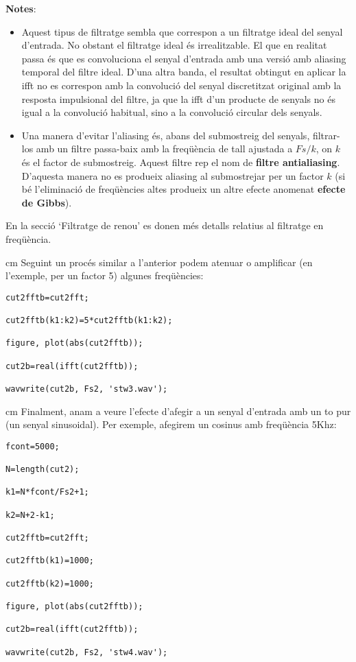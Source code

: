 \documentclass{article}
\begin{document}
\textbf{Notes}:
\begin{itemize}
\item Aquest tipus de filtratge sembla que correspon a un filtratge ideal  del senyal d'entrada. No obstant
el filtratge ideal és irrealitzable. El que en realitat passa és que es convoluciona el senyal d'entrada amb una versió amb
aliasing temporal del filtre ideal. D'una altra banda, el resultat obtingut en aplicar la ifft no es correspon amb la convolució
del senyal discretitzat original amb la resposta impulsional del filtre, ja que la ifft d'un producte de senyals no és igual
a la convolució habitual, sino a la convolució circular dels senyals.
\item Una manera d'evitar l'aliasing és, abans del submostreig del senyals, filtrar-los amb un filtre passa-baix amb la
freqüència de tall ajustada a $Fs/k$, on $k$ és el factor de submostreig. Aquest filtre rep el nom de \textbf{filtre antialiasing}.
D'aquesta manera no es produeix aliasing al submostrejar per un factor $k$
(si bé l'eliminació de freqüències altes produeix un altre efecte anomenat \textbf{efecte de Gibbs}).
\end{itemize}

En la secció `Filtratge de renou' es donen més detalls relatius al filtratge en freqüència.


 cm
Seguint un procés similar a l'anterior podem atenuar o amplificar (en l'exemple, per un factor 5) algunes freqüències:
\begin{verbatim}
cut2fftb=cut2fft;

cut2fftb(k1:k2)=5*cut2fftb(k1:k2);

figure, plot(abs(cut2fftb));

cut2b=real(ifft(cut2fftb));

wavwrite(cut2b, Fs2, 'stw3.wav');
\end{verbatim}

 cm
Finalment, anam a veure l'efecte d'afegir a un senyal d'entrada amb un to pur (un senyal sinusoidal).
Per exemple, afegirem un cosinus amb freqüència 5Khz:

\begin{verbatim}
fcont=5000;

N=length(cut2);

k1=N*fcont/Fs2+1;

k2=N+2-k1;

cut2fftb=cut2fft;

cut2fftb(k1)=1000;

cut2fftb(k2)=1000;

figure, plot(abs(cut2fftb));

cut2b=real(ifft(cut2fftb));

wavwrite(cut2b, Fs2, 'stw4.wav');

\end{verbatim}
\end{document}
